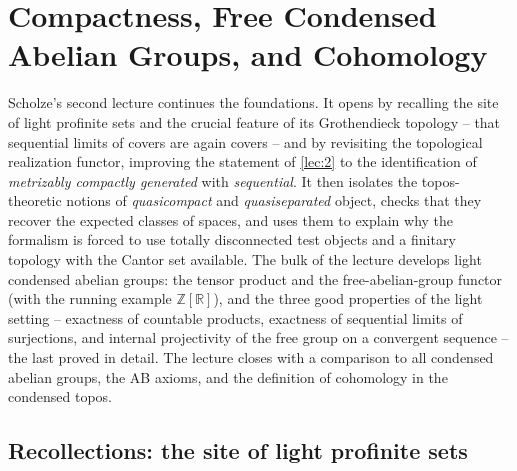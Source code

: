 \section{Compactness, Free Condensed Abelian Groups, and Cohomology}
\label{lec:3}

Scholze's second lecture continues the foundations. It opens by recalling the
site of light profinite sets and the crucial feature of its Grothendieck
topology -- that sequential limits of covers are again covers -- and by
revisiting the topological realization functor, improving the statement of
\cref{lec:2} to the identification of \emph{metrizably compactly generated} with
\emph{sequential}. It then isolates the topos-theoretic notions of
\emph{quasicompact} and \emph{quasiseparated} object, checks that they recover
the expected classes of spaces, and uses them to explain why the formalism is
forced to use totally disconnected test objects and a finitary topology with the
Cantor set available. The bulk of the lecture develops light condensed abelian
groups: the tensor product and the free-abelian-group functor (with the running
example $\mathbb{Z}[\mathbb{R}]$), and the three good properties of the light
setting -- exactness of countable products, exactness of sequential limits of
surjections, and internal projectivity of the free group on a convergent
sequence -- the last proved in detail. The lecture closes with a comparison to
all condensed abelian groups, the AB axioms, and the definition of cohomology in
the condensed topos.

\subsection{Recollections: the site of light profinite sets}

